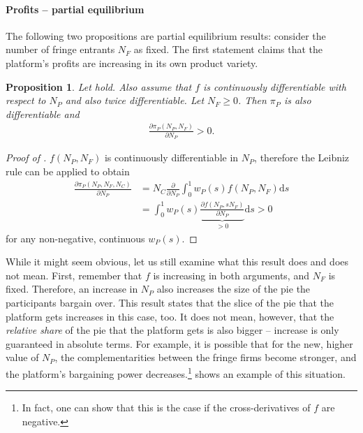 \documentclass[a4paper]{article}
\newtheorem{proposition}{Proposition}
\newcommand{\ds}{\mathrm{d}s}
\begin{document}
\paragraph{Profits -- partial equilibrium}
The following two propositions are partial equilibrium results: consider the number of fringe entrants $N_F$ as fixed.
The first statement claims that the platform's profits are increasing in its own product variety.
\begin{proposition}
    \label{prop:share_of_platform}
    Let  hold.
    Also assume that $f$ is continuously differentiable with respect to $N_P$ and also twice differentiable.
    Let $N_F \geq 0$.
    Then $\pi_P$ is also differentiable and
    \begin{align*}
        \frac{\partial \pi_P(N_P, N_F)}{\partial N_P} > 0.
    \end{align*}
\end{proposition}
\begin{proof}[Proof of ]
    $f(N_P, N_F)$ is continuously differentiable in $N_P$, therefore the Leibniz rule can be applied to obtain
    \begin{align*}
        \frac{\partial \pi_P(N_P, N_F, N_C)}{\partial N_P} &= N_C \frac{\partial}{\partial N_P} \int_0^1 w_P(s) f(N_P, N_F) \ds \\
        &= \int_0^1 w_P(s) \underbrace{\frac{\partial f(N_P, sN_F)}{\partial N_P}}_{> 0} \ds > 0
    \end{align*}
    for any non-negative, continuous $w_P(s)$.
\end{proof}
While it might seem obvious, let us still examine what this result does and does not mean.
First, remember that $f$ is increasing in both arguments, and $N_F$ is fixed.
Therefore, an increase in $N_P$ also increases the size of the pie the participants bargain over.
This result states that the slice of the pie that the platform gets increases in this case, too.
It does not mean, however, that the \emph{relative share} of the pie that the platform gets is also bigger -- increase is only guaranteed in absolute terms.
For example, it is possible that for the new, higher value of $N_P$, the complementarities between the fringe firms become stronger, and the platform's bargaining power decreases.\footnote{
    In fact, one can show that this is the case if the cross-derivatives of $f$ are negative.
}
 shows an example of this situation.
\end{document}
